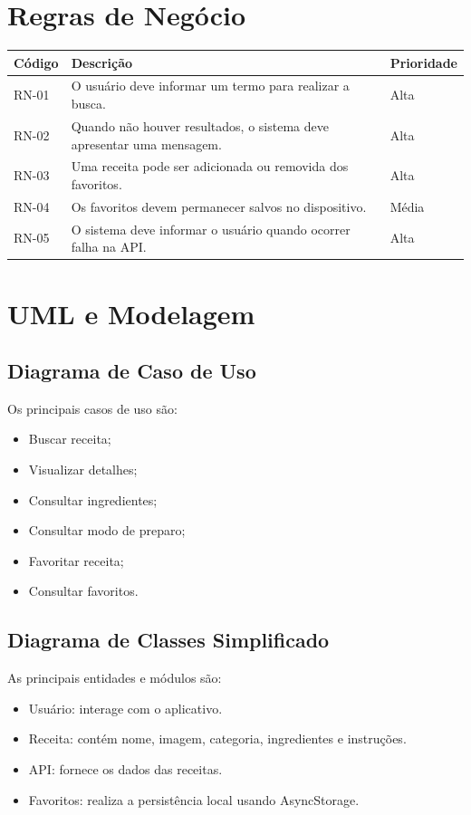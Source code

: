 \documentclass[12pt,a4paper]{article}
\begin{document}
\section{Regras de Negócio}

\begin{longtable}{p{2cm}p{8cm}p{2cm}}
\toprule
Código & Descrição & Prioridade\\
\midrule
RN-01 & O usuário deve informar um termo para realizar a busca. & Alta\\
RN-02 & Quando não houver resultados, o sistema deve apresentar uma mensagem. & Alta\\
RN-03 & Uma receita pode ser adicionada ou removida dos favoritos. & Alta\\
RN-04 & Os favoritos devem permanecer salvos no dispositivo. & Média\\
RN-05 & O sistema deve informar o usuário quando ocorrer falha na API. & Alta\\
\bottomrule
\end{longtable}

\section{UML e Modelagem}

\subsection{Diagrama de Caso de Uso}

Os principais casos de uso são:

\begin{itemize}
\item Buscar receita;
\item Visualizar detalhes;
\item Consultar ingredientes;
\item Consultar modo de preparo;
\item Favoritar receita;
\item Consultar favoritos.
\end{itemize}

\subsection{Diagrama de Classes Simplificado}

As principais entidades e módulos são:

\begin{itemize}
\item Usuário: interage com o aplicativo.
\item Receita: contém nome, imagem, categoria, ingredientes e instruções.
\item API: fornece os dados das receitas.
\item Favoritos: realiza a persistência local usando AsyncStorage.
\end{itemize}
\end{document}
